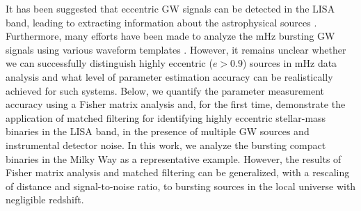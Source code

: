 \documentclass[%
 reprint,
 amsmath,amssymb,
 aps,
]{revtex4-2}
\begin{document}
It has been suggested that eccentric GW signals can be detected in the LISA band, leading to extracting information about the astrophysical sources \citep[see, e.g., ][]{Seto+01,Glampedakis_2005,Hopman2006,Rubbo06,Amaro_Seoane_2007,Barack_2009,Thompson+11,mikoczi2012,Berry_2013,Chen_2018,Fang_2019,Hoang+19,Wang+21,Randall_2022,Fan22,oliver2023gravitational,Naoz+22,Naoz+23,Zhang_2021,Xuan23acc,Shariat+23WDgaia}. Furthermore, many efforts have been made to analyze the mHz bursting GW signals using various waveform templates \citep{Loutrel_2017,Moore2018,Han+20EMRIburst,Loutrel+20,Romero23, knee2024detectinggravitationalwaveburstsblack,Zhangzhongfu+24flybyburst}. However, it remains unclear whether we can successfully distinguish highly eccentric ($e>0.9$) sources in mHz data analysis and what level of parameter estimation accuracy can be realistically achieved for such systems.
Below, we quantify the parameter measurement accuracy using a Fisher matrix analysis and, for the first time, demonstrate the application of matched filtering for identifying highly eccentric stellar-mass binaries in the LISA band, in the presence of multiple GW sources and instrumental detector noise.
In this work, we analyze the bursting compact binaries in the Milky Way as a representative example. However, the results of Fisher matrix analysis and matched filtering can be generalized, with a rescaling of distance and signal-to-noise ratio, to bursting sources in the local universe with negligible redshift.


\end{document}
